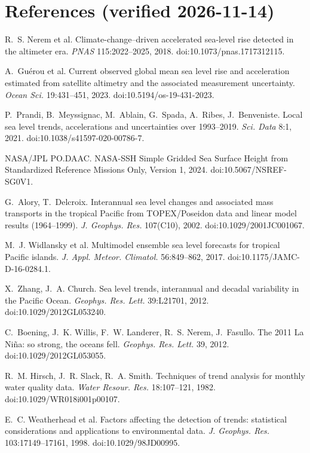 \documentclass[10pt]{article}
\begin{document}
\section*{References (verified 2026-11-14)}
{\small\sloppy
\begin{enumerate}[label={[\arabic*]},leftmargin=2.2em]
\item R.~S. Nerem et al. Climate-change--driven accelerated sea-level rise detected in the altimeter era. \emph{PNAS} 115:2022--2025, 2018. doi:10.1073/pnas.1717312115.
\item A.~Gu\'erou et al. Current observed global mean sea level rise and acceleration estimated from satellite altimetry and the associated measurement uncertainty. \emph{Ocean Sci.} 19:431--451, 2023. doi:10.5194/os-19-431-2023.
\item P.~Prandi, B.~Meyssignac, M.~Ablain, G.~Spada, A.~Ribes, J.~Benveniste. Local sea level trends, accelerations and uncertainties over 1993--2019. \emph{Sci. Data} 8:1, 2021. doi:10.1038/s41597-020-00786-7.
\item NASA/JPL PO.DAAC. NASA-SSH Simple Gridded Sea Surface Height from Standardized Reference Missions Only, Version 1, 2024. doi:10.5067/NSREF-SG0V1.
\item G.~Alory, T.~Delcroix. Interannual sea level changes and associated mass transports in the tropical Pacific from TOPEX/Poseidon data and linear model results (1964--1999). \emph{J. Geophys. Res.} 107(C10), 2002. doi:10.1029/2001JC001067.
\item M.~J. Widlansky et al. Multimodel ensemble sea level forecasts for tropical Pacific islands. \emph{J. Appl. Meteor. Climatol.} 56:849--862, 2017. doi:10.1175/JAMC-D-16-0284.1.
\item X.~Zhang, J.~A. Church. Sea level trends, interannual and decadal variability in the Pacific Ocean. \emph{Geophys. Res. Lett.} 39:L21701, 2012. doi:10.1029/2012GL053240.
\item C.~Boening, J.~K. Willis, F.~W. Landerer, R.~S. Nerem, J.~Fasullo. The 2011 La Ni\~na: so strong, the oceans fell. \emph{Geophys. Res. Lett.} 39, 2012. doi:10.1029/2012GL053055.
\item R.~M. Hirsch, J.~R. Slack, R.~A. Smith. Techniques of trend analysis for monthly water quality data. \emph{Water Resour. Res.} 18:107--121, 1982. doi:10.1029/WR018i001p00107.
\item E.~C. Weatherhead et al. Factors affecting the detection of trends: statistical considerations and applications to environmental data. \emph{J. Geophys. Res.} 103:17149--17161, 1998. doi:10.1029/98JD00995.

\end{enumerate}}
\end{document}
